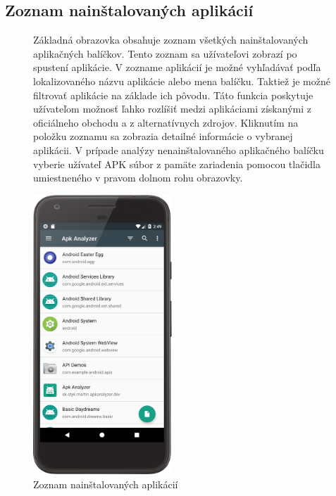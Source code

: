 \subsection{Zoznam nainštalovaných aplikácií}
\begin{figure}[H]
\begin{minipage}[t]{0.48\textwidth}
Základná obrazovka obsahuje zoznam všetkých nainštalovaných aplikačných balíčkov. Tento zoznam sa užívateľovi zobrazí po spustení aplikácie. V zozname aplikácií je možné vyhľadávať podľa lokalizovaného názvu aplikácie alebo mena balíčku. Taktiež je možné filtrovať aplikácie na základe ich pôvodu. Táto funkcia poskytuje užívateľom možnosť ľahko rozlíšiť medzi aplikáciami získanými z oficiálneho obchodu a z alternatívnych zdrojov. Kliknutím na položku zoznamu sa zobrazia detailné informácie o vybranej aplikácii. V prípade analýzy nenainštalovaného aplikačného balíčku vyberie užívateľ APK súbor z pamäte zariadenia pomocou tlačidla umiestneného v pravom dolnom rohu obrazovky.
\end{minipage}%
\hfill
\centering
\begin{minipage}[t][][b]{0.45\textwidth}
\centering
\includegraphics[width=5.2cm]{images/app/list_device.png}
\centering
\caption{Zoznam nainštalovaných aplikácií}
\label{fig:app-list}
\end{minipage}%
\end{figure}

